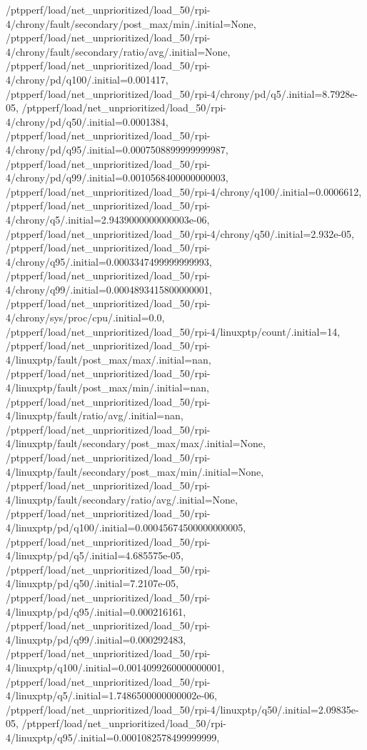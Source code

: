 {    /ptpperf/load/net_unprioritized/load_50/rpi-4/chrony/fault/secondary/post_max/min/.initial=None,
    /ptpperf/load/net_unprioritized/load_50/rpi-4/chrony/fault/secondary/ratio/avg/.initial=None,
    /ptpperf/load/net_unprioritized/load_50/rpi-4/chrony/pd/q100/.initial=0.001417,
    /ptpperf/load/net_unprioritized/load_50/rpi-4/chrony/pd/q5/.initial=8.7928e-05,
    /ptpperf/load/net_unprioritized/load_50/rpi-4/chrony/pd/q50/.initial=0.0001384,
    /ptpperf/load/net_unprioritized/load_50/rpi-4/chrony/pd/q95/.initial=0.0007508899999999987,
    /ptpperf/load/net_unprioritized/load_50/rpi-4/chrony/pd/q99/.initial=0.0010568400000000003,
    /ptpperf/load/net_unprioritized/load_50/rpi-4/chrony/q100/.initial=0.0006612,
    /ptpperf/load/net_unprioritized/load_50/rpi-4/chrony/q5/.initial=2.9439000000000003e-06,
    /ptpperf/load/net_unprioritized/load_50/rpi-4/chrony/q50/.initial=2.932e-05,
    /ptpperf/load/net_unprioritized/load_50/rpi-4/chrony/q95/.initial=0.0003347499999999993,
    /ptpperf/load/net_unprioritized/load_50/rpi-4/chrony/q99/.initial=0.0004893415800000001,
    /ptpperf/load/net_unprioritized/load_50/rpi-4/chrony/sys/proc/cpu/.initial=0.0,
    /ptpperf/load/net_unprioritized/load_50/rpi-4/linuxptp/count/.initial=14,
    /ptpperf/load/net_unprioritized/load_50/rpi-4/linuxptp/fault/post_max/max/.initial=nan,
    /ptpperf/load/net_unprioritized/load_50/rpi-4/linuxptp/fault/post_max/min/.initial=nan,
    /ptpperf/load/net_unprioritized/load_50/rpi-4/linuxptp/fault/ratio/avg/.initial=nan,
    /ptpperf/load/net_unprioritized/load_50/rpi-4/linuxptp/fault/secondary/post_max/max/.initial=None,
    /ptpperf/load/net_unprioritized/load_50/rpi-4/linuxptp/fault/secondary/post_max/min/.initial=None,
    /ptpperf/load/net_unprioritized/load_50/rpi-4/linuxptp/fault/secondary/ratio/avg/.initial=None,
    /ptpperf/load/net_unprioritized/load_50/rpi-4/linuxptp/pd/q100/.initial=0.00045674500000000005,
    /ptpperf/load/net_unprioritized/load_50/rpi-4/linuxptp/pd/q5/.initial=4.685575e-05,
    /ptpperf/load/net_unprioritized/load_50/rpi-4/linuxptp/pd/q50/.initial=7.2107e-05,
    /ptpperf/load/net_unprioritized/load_50/rpi-4/linuxptp/pd/q95/.initial=0.000216161,
    /ptpperf/load/net_unprioritized/load_50/rpi-4/linuxptp/pd/q99/.initial=0.000292483,
    /ptpperf/load/net_unprioritized/load_50/rpi-4/linuxptp/q100/.initial=0.0014099260000000001,
    /ptpperf/load/net_unprioritized/load_50/rpi-4/linuxptp/q5/.initial=1.7486500000000002e-06,
    /ptpperf/load/net_unprioritized/load_50/rpi-4/linuxptp/q50/.initial=2.09835e-05,
    /ptpperf/load/net_unprioritized/load_50/rpi-4/linuxptp/q95/.initial=0.0001082578499999999,
}
